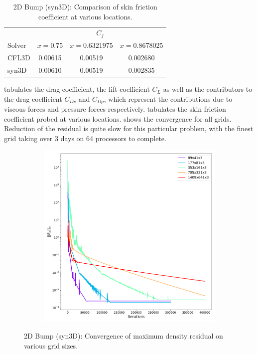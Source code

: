 \begin{table}[ht!]
\centering
\caption{2D Bump (syn3D): Comparison of skin friction coefficient at various locations.}
\label{tab:syn2dbump2}
\begin{tabular}{lccc}
\toprule
& \multicolumn{3}{c}{$C_f$} \\
\cline{2-4}
Solver & $x=0.75$ & $x=0.6321975$ & $x=0.8678025$ \\
\midrule
CFL3D & 0.00615 & 0.00519  & 0.002680   \\
syn3D & 0.00610 & 0.00519  & 0.002835  \\
\bottomrule
\end{tabular}

\end{table}

 tabulates the drag coefficient, the lift coefficient $C_L$ as well as the contributors to the drag coefficient $C_{Dv}$ and $C_{Dp}$, which represent the contributions due to viscous forces and pressure forces respectively.  tabulates the skin friction coefficient probed at various locations.  shows the convergence for all grids. Reduction of the residual is quite slow for this particular problem, with the finest grid taking over 3 days on 64 processors to complete.
\begin{figure}[ht!]
\centering
\begin{subfigure}{.45\textwidth}
  \centering
  \includegraphics[width=1.0\textwidth]{figs/2dbump/convergenceRho.pdf}
\end{subfigure}%
\caption{2D Bump (syn3D): Convergence of maximum density residual on various grid sizes.}
\label{fig:syn2dbumpcnvstudy}
\end{figure}

